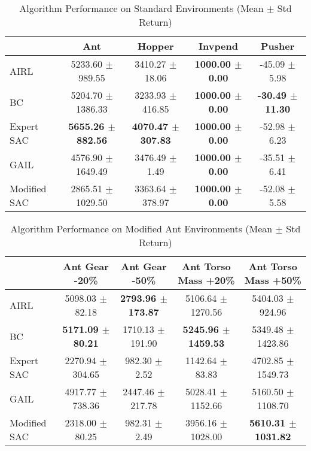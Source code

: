 

\begin{table}
\caption{Algorithm Performance on Standard Environments (Mean $\pm$ Std Return)}
\label{tab:perf_standard}
\begin{adjustbox}{max width=\textwidth, center}
\begin{tabular}{lcccc}
\toprule
 & Ant & Hopper & Invpend & Pusher \\
\midrule
AIRL & 5233.60 $\pm$ 989.55 & 3410.27 $\pm$ 18.06 & \textbf{1000.00 $\pm$ 0.00} & -45.09 $\pm$ 5.98 \\
BC & 5204.70 $\pm$ 1386.33 & 3233.93 $\pm$ 416.85 & \textbf{1000.00 $\pm$ 0.00} & \textbf{-30.49 $\pm$ 11.30} \\
Expert SAC & \textbf{5655.26 $\pm$ 882.56} & \textbf{4070.47 $\pm$ 307.83} & \textbf{1000.00 $\pm$ 0.00} & -52.98 $\pm$ 6.23 \\
GAIL & 4576.90 $\pm$ 1649.49 & 3476.49 $\pm$ 1.49 & \textbf{1000.00 $\pm$ 0.00} & -35.51 $\pm$ 6.41 \\
Modified SAC & 2865.51 $\pm$ 1029.50 & 3363.64 $\pm$ 378.97 & \textbf{1000.00 $\pm$ 0.00} & -52.08 $\pm$ 5.58 \\
\bottomrule
\end{tabular}
\end{adjustbox}
\end{table}



\begin{table}
\caption{Algorithm Performance on Modified Ant Environments (Mean $\pm$ Std Return)}
\label{tab:perf_mod_ant}
\begin{adjustbox}{max width=\textwidth, center}
\begin{tabular}{lcccc}
\toprule
 & Ant Gear -20\% & Ant Gear -50\% & Ant Torso Mass +20\% & Ant Torso Mass +50\% \\
\midrule
AIRL & 5098.03 $\pm$ 82.18 & \textbf{2793.96 $\pm$ 173.87} & 5106.64 $\pm$ 1270.56 & 5404.03 $\pm$ 924.96 \\
BC & \textbf{5171.09 $\pm$ 80.21} & 1710.13 $\pm$ 191.90 & \textbf{5245.96 $\pm$ 1459.53} & 5349.48 $\pm$ 1423.86 \\
Expert SAC & 2270.94 $\pm$ 304.65 & 982.30 $\pm$ 2.52 & 1142.64 $\pm$ 83.83 & 4702.85 $\pm$ 1549.73 \\
GAIL & 4917.77 $\pm$ 738.36 & 2447.46 $\pm$ 217.78 & 5028.41 $\pm$ 1152.66 & 5160.50 $\pm$ 1108.70 \\
Modified SAC & 2318.00 $\pm$ 80.25 & 982.31 $\pm$ 2.49 & 3956.16 $\pm$ 1028.00 & \textbf{5610.31 $\pm$ 1031.82} \\
\bottomrule
\end{tabular}
\end{adjustbox}
\end{table}



